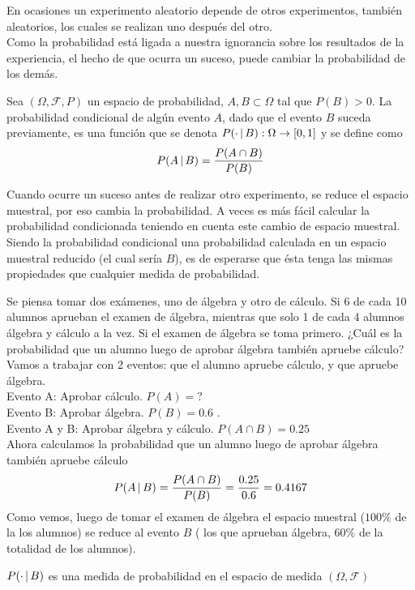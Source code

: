 En ocasiones un experimento aleatorio depende de otros experimentos, también aleatorios, los cuales se realizan uno después del otro.\\
Como la probabilidad está ligada a nuestra ignorancia sobre los resultados de la experiencia, el hecho de que ocurra un suceso, puede cambiar la probabilidad de los demás.
\begin{Def}
    Sea $(\Omega,\mathscr{F},P)$ un espacio de probabilidad, $A,B\subset\Omega$ tal que $P(B)>0$. La probabilidad condicional de algún evento $A$, dado que el evento $B$ suceda previamente, es una función que se denota $P(\cdot\thinspace|\thinspace B):\Omega\rightarrow [0,1]$ y se define como $$P(A\thinspace|\thinspace B)=\frac{P(A\cap B)}{P(B)}$$
\end{Def}
Cuando ocurre un suceso antes de realizar otro experimento, se reduce el espacio muestral, por eso cambia la probabilidad. A veces es más fácil calcular la probabilidad condicionada teniendo en cuenta este cambio de espacio muestral. 
    Siendo la probabilidad condicional una probabilidad calculada en un espacio muestral reducido (el cual sería $B$), es de esperarse que ésta tenga las mismas propiedades que cualquier medida de probabilidad.
\begin{Ejm}
Se piensa tomar dos exámenes, uno de álgebra y otro de cálculo.
  Si 6 de cada 10 alumnos aprueban el examen de álgebra, mientras que solo 1 de cada 4 alumnos  álgebra y cálculo a la vez. Si el examen de álgebra se toma primero. ¿Cuál es la probabilidad que un alumno luego de aprobar álgebra también apruebe cálculo?
    Vamos a trabajar con 2 eventos: que el alumno apruebe cálculo, y que apruebe álgebra.\\
    Evento A: Aprobar cálculo. $P(A) = ?$\\
    Evento B: Aprobar álgebra. $P(B) =0.6$ .\\
    Evento A y B: Aprobar álgebra y cálculo. $P(A\cap B) =0.25$\\
    Ahora calculamos la probabilidad que un alumno luego de aprobar álgebra también apruebe cálculo
    $$P(A\thinspace|\thinspace B)=\frac{P(A\cap B)}{P(B)}=\frac{0.25}{0.6}=0.4167$$
  Como vemos, luego de tomar el examen de álgebra el espacio muestral ($100\%$ de la los alumnos) se reduce al evento $B$ ( los que aprueban álgebra, $60 \%$ de la totalidad de los alumnos).
  \end{Ejm}
\begin{Prop}
    $P(\cdot\thinspace|\thinspace B)$ es una medida de probabilidad en el espacio de medida $(\Omega,\mathscr{F})$
\end{Prop}
